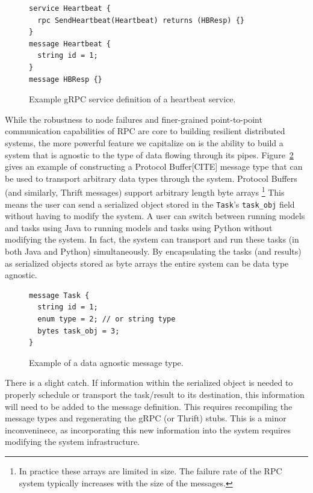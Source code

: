 \documentclass[conference]{IEEEtran}
\begin{document}
\begin{figure}
  \begin{lstlisting}
service Heartbeat {
  rpc SendHeartbeat(Heartbeat) returns (HBResp) {}
}
message Heartbeat {
  string id = 1;
}
message HBResp {}
\end{lstlisting}
\caption{Example gRPC service definition of a heartbeat service.}
\label{fig:heartbeat}
\end{figure}

While the robustness to node failures and finer-grained point-to-point
communication capabilities of RPC are core to building resilient
distributed systems, the more powerful feature we capitalize on is
the ability to build a system that is agnostic to the type of data
flowing through its pipes. Figure~\ref{fig:data-agnostic} gives an example
of constructing a Protocol Buffer[CITE] message type that can be used to
transport arbitrary data types through the system. Protocol Buffers (and
similarly, Thrift messages) support arbitrary length byte arrays
\footnote{In practice
  these arrays are limited in size. The failure rate of the RPC system
  typically increases with the size of the messages.} This means the
user can send a serialized object stored in the \texttt{Task}'s
\texttt{task\_obj} field without having to modify the system.
A user can switch between running models and tasks using Java to running
models and tasks using Python without modifying the system. In fact,
the system can transport and run these tasks (in both Java and Python)
simultaneously. By encapsulating the tasks (and results) as serialized
objects stored as byte arrays the entire system can be data type
agnostic.

\begin{figure}
  \begin{lstlisting}
message Task {
  string id = 1;
  enum type = 2; // or string type
  bytes task_obj = 3;
}
  \end{lstlisting}
  \caption{Example of a data agnostic message type.}\label{fig:data-agnostic}
\end{figure}

There is a slight catch. If information within the serialized object
is needed to properly schedule or transport the task/result to its
destination, this information will need to be added to the message
definition. This requires recompiling the message types and regenerating
the gRPC (or Thrift) stubs. This is a minor inconveninece, as incorporating
this new information into the system requires modifying the system
infrastructure.
\end{document}
